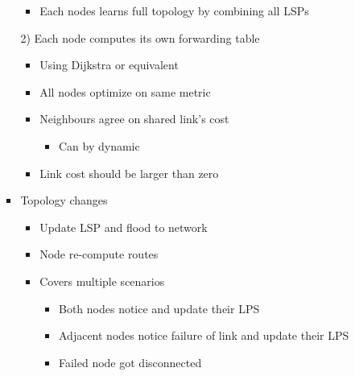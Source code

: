\begin{itemize}
\begin{itemize}
\begin{itemize}
\begin{itemize}
                        \item Each nodes learns full topology by combining all LSPs
                    \end{itemize}
                \item[2)] Each node computes its own forwarding table
                    \begin{itemize}
                        \item Using Dijkstra or equivalent
                        \item All nodes optimize on same metric
                        \item Neighbours agree on shared link's cost
                            \begin{itemize}
                                \item Can by dynamic
                            \end{itemize}
                        \item Link cost should be larger than zero
                    \end{itemize}
                \item Topology changes
                    \begin{itemize}
                        \item Update LSP and flood to network
                        \item Node re-compute routes
                        \item Covers multiple scenarios
                            \begin{itemize}
                                    \begin{itemize}
                                        \item Both nodes notice and update their LPS
                                    \end{itemize}
                                    \begin{itemize}
                                        \item Adjacent nodes notice failure of link and update their LPS
                                        \item Failed node got disconnected
                                    \end{itemize}
                                    \begin{itemize}

\end{itemize}
\end{itemize}
\end{itemize}
\end{itemize}
\end{itemize}
\end{itemize}
